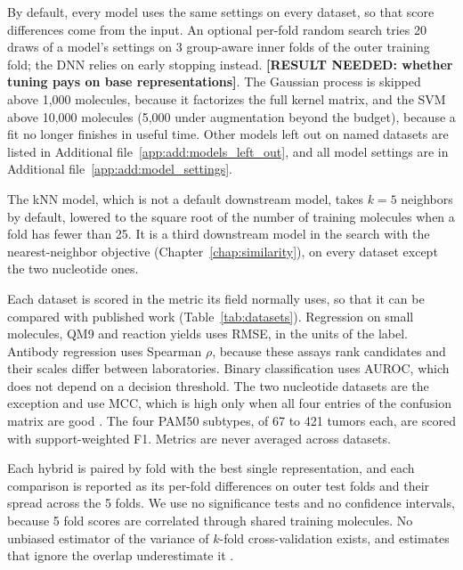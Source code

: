 By default, every model uses the same settings on every dataset, so that score differences come from the input. An optional per-fold random search tries 20 draws of a model's settings on 3 group-aware inner folds of the outer training fold; the DNN relies on early stopping instead. \textbf{[RESULT NEEDED: whether tuning pays on base representations]}. The Gaussian process is skipped above 1,000 molecules, because it factorizes the full kernel matrix, and the SVM above 10,000 molecules (5,000 under augmentation beyond the budget), because a fit no longer finishes in useful time. Other models left out on named datasets are listed in Additional file~\ref{app:add:models_left_out}, and all model settings are in Additional file~\ref{app:add:model_settings}.

The kNN model, which is not a default downstream model, takes $k = 5$ neighbors by default, lowered to the square root of the number of training molecules when a fold has fewer than 25. It is a third downstream model in the search with the nearest-neighbor objective (Chapter~\ref{chap:similarity}), on every dataset except the two nucleotide ones.

Each dataset is scored in the metric its field normally uses, so that it can be compared with published work (Table~\ref{tab:datasets}). Regression on small molecules, QM9 and reaction yields uses RMSE, in the units of the label. Antibody regression uses Spearman $\rho$, because these assays rank candidates and their scales differ between laboratories. Binary classification uses AUROC, which does not depend on a decision threshold. The two nucleotide datasets are the exception and use MCC, which is high only when all four entries of the confusion matrix are good \citep{Chicco2020}. The four PAM50 subtypes, of 67 to 421 tumors each, are scored with support-weighted F1. Metrics are never averaged across datasets.

Each hybrid is paired by fold with the best single representation, and each comparison is reported as its per-fold differences on outer test folds and their spread across the 5 folds. We use no significance tests and no confidence intervals, because 5 fold scores are correlated through shared training molecules. No unbiased estimator of the variance of $k$-fold cross-validation exists, and estimates that ignore the overlap underestimate it \citep{Bengio2004}.

